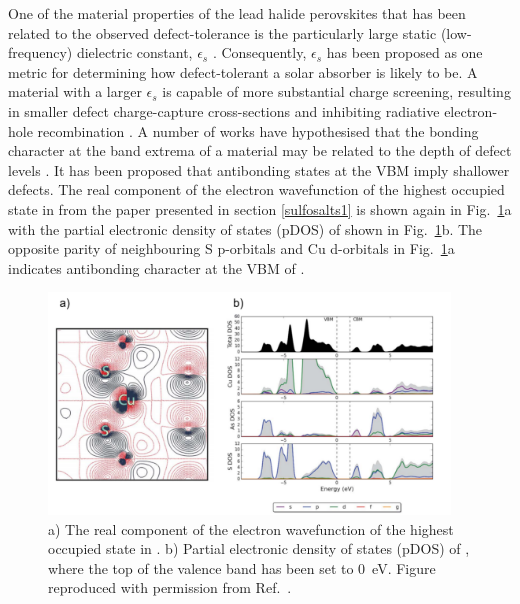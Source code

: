 \documentclass[11pt, twoside]{report}
\begin{document}
One of the material properties of the lead halide perovskites that has been related to the observed defect-tolerance is the particularly large static (low-frequency) dielectric constant, $\epsilon_s$ \cite{MIT_defect_tolerance}. Consequently, $\epsilon_s$ has been proposed as one metric for determining how defect-tolerant a solar absorber is likely to be. A material with a larger $\epsilon_s$ is capable of more substantial charge screening, resulting in smaller defect charge-capture cross-sections and inhibiting radiative electron-hole recombination \cite{beyond_MAPI}.
A number of works have hypothesised that the bonding character at the band extrema of a material may be related to the depth of defect levels \cite{MAPI_defect_phys, Andriy_defect_tolerance, MIT_defect_tolerance, MAPI_defect_phys}. It has been proposed that antibonding states at the VBM imply shallower defects. The real component of the electron wavefunction of the highest occupied state in {\enargite} from the paper presented in section \ref{sulfosalts1} \cite{sulfosalts_paper} is shown again in Fig.~\ref{enargite_bonding}a with the partial electronic density of states (pDOS) of {\enargite} shown in Fig.~\ref{enargite_bonding}b. The opposite parity of neighbouring S p-orbitals and Cu d-orbitals in Fig.~\ref{enargite_bonding}a indicates antibonding character at the VBM of {\enargite}.

\begin{figure}[h!]
    \centering
    \includegraphics[width=0.95\textwidth]{figures/enargite_bonding.png}
    \caption[a) The real component of the electron wavefunction of the highest occupied state in {\enargite}. b) Partial electronic density of states (pDOS) of {\enargite}, where the top of the valence band has been set to \SI{0}{eV}.]{a) The real component of the electron wavefunction of the highest occupied state in {\enargite}. b) Partial electronic density of states (pDOS) of {\enargite}, where the top of the valence band has been set to \SI{0}{eV}. Figure reproduced with permission from Ref.~.}
    \label{enargite_bonding}
\end{figure}
\end{document}
